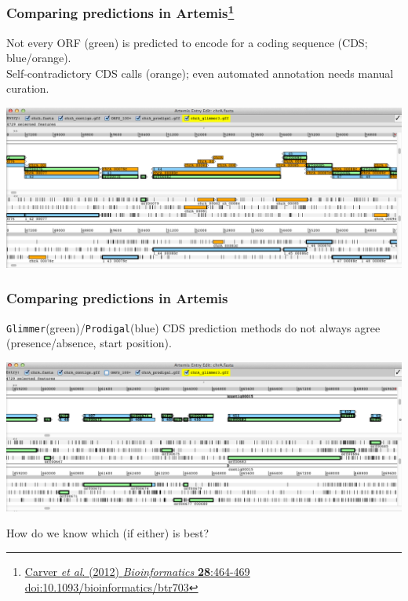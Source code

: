 \begin{frame}
  \frametitle{Comparing predictions in Artemis\footnote{\tiny{\href{http://dx.doi.org/10.1093/bioinformatics/btr703}{Carver \textit{et al}. (2012) \textit{Bioinformatics} \textbf{28}:464-469 doi:10.1093/bioinformatics/btr703}}}}
  Not every ORF (green) is predicted to encode for a coding sequence (CDS; blue/orange).\\
  Self-contradictory CDS calls (orange); even automated annotation needs manual curation.
  \begin{center}
    \includegraphics[width=1\textwidth]{images/artemis_cdspred3}     
  \end{center}
\end{frame}

\begin{frame}
  \frametitle{Comparing predictions in Artemis}
  \texttt{Glimmer}(green)/\texttt{Prodigal}(blue) CDS prediction methods do not always agree (presence/absence, start position).
  \begin{center}
    \includegraphics[width=1\textwidth]{images/artemis_cdspred4}     
  \end{center}
  How do we know which (if either) is best?
\end{frame}